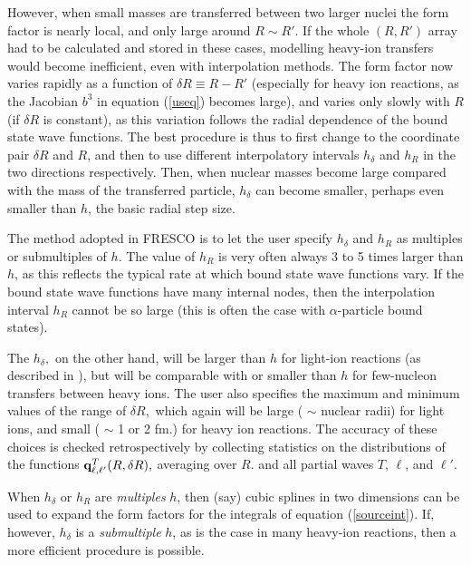 \documentclass[11pt,a4paper]{article}
\begin{document}
However, when small masses are transferred between two larger nuclei
the form factor is nearly local, and only large around
$R \sim R' .$
If the whole $(R,R')$ array had to be calculated and stored in
these cases,
modelling heavy-ion transfers would become inefficient,
even with interpolation methods.
The form factor now varies rapidly as a function of
$\delta R \equiv R - R'$ (especially for heavy ion reactions,
as the Jacobian $b^3$ in equation (\ref{useq}) becomes large),
and varies only slowly with $R$ (if $\delta R$ is constant),
as this variation follows the radial dependence of the bound state
wave functions.
The best procedure is thus \cite{SM1}
to first change to the coordinate pair
$\delta R$ and $R$, and then to use different interpolatory
intervals $h_\delta$ and $h_R$ in the two directions
respectively. Then, when nuclear masses become large compared with the mass
of the transferred particle, $h_\delta$ can become smaller,
perhaps even smaller than $h$, the basic radial step size.

The method adopted in FRESCO is to let the user specify
$h_\delta$ and $h_R $ as multiples or
submultiples of $h$. The value of $h_R $ is very often always 3 to 5
times larger than $h$, as this reflects the typical rate at which bound
state wave functions vary.
If the bound state wave functions have many internal nodes, then the
interpolation interval $h_R$ cannot be so large
(this is often the case with $\alpha$-particle bound states).

The $h_\delta ,$
on the other hand, will be larger than $h$ for light-ion reactions
(as described in \cite{TUM}), but will be comparable with or smaller than
$h$ for few-nucleon transfers between heavy ions.  The user also
specifies the maximum and minimum values of the range of $\delta R ,$
which again will be large ( $\sim$ nuclear radii) for light ions,
and small ( $\sim$ 1 or 2 fm.) for heavy ion reactions.  The accuracy of these
choices is checked retrospectively by collecting statistics on the
distributions of the functions
$ {\bf q}^T_{\ell , \ell'} (R, \delta R),$ averaging
over $R$. and all partial waves $T$, $\ell$, and $\ell' .$

When $h_\delta$ or $h_R $ are {\em multiples} $h$,
then (say) cubic splines in two dimensions can be used to expand the form
factors for the integrals of equation (\ref{sourceint}).
If, however, $h_\delta$ is a {\em submultiple} $h$,
as is the case in many heavy-ion reactions,
then a more efficient procedure is possible.
\end{document}
